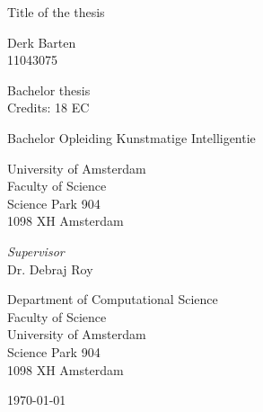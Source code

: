 \begin{center}

\vspace{1.7cm}

\begin{Huge}
Title of the thesis
\end{Huge}

\vspace{1.5cm}

Derk Barten\\
11043075

\vspace{1.5cm}

Bachelor thesis\\
Credits: 18 EC

\vspace{0.5cm}

Bachelor Opleiding Kunstmatige Intelligentie

\vspace{0.25cm}

University of Amsterdam\\
Faculty of Science\\
Science Park 904\\
1098 XH Amsterdam

\vspace{4cm}

\emph{Supervisor}\\
Dr. Debraj Roy

\vspace{0.25cm}

Department of Computational Science\\
Faculty of Science\\
University of Amsterdam\\
Science Park 904\\
1098 XH  Amsterdam

\vspace{1.5cm}

\today

\end{center}

